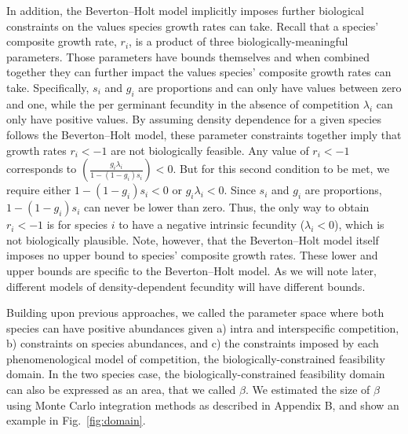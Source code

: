\begin{refsection}
In addition, the Beverton--Holt model implicitly imposes further biological constraints on the values species growth rates can take. Recall that a species' composite growth rate, $r_{i}$, is a product of three biologically-meaningful parameters. Those parameters have bounds themselves and when combined together they can further impact the values species' composite growth rates can take. Specifically, $s_{i}$ and $g_{i}$ are proportions and can only have values between zero and one, while the per germinant fecundity in the absence of competition $\lambda_{i}$ can only have positive values. By assuming density dependence for a given species follows the Beverton--Holt model, these parameter constraints together imply that growth rates $r_i < -1$ are not biologically feasible. Any value of $r_{i} < -1$ corresponds to $\left( \frac{g_{i}\lambda_{i}}{1-(1-g_{i})s_{i}} \right) < 0$. But for this second condition to be met, we require either $1-(1-g_{i})s_{i} < 0$ or $g_{i}\lambda_{i} < 0$. Since $s_{i}$ and $g_{i}$ are proportions, $1-(1-g_{i})s_{i}$ can never be lower than zero.  Thus, the only way to obtain $r_{i} < -1$ is for species $i$ to have a negative intrinsic fecundity ($\lambda_i < 0$), which is not biologically plausible. Note, however, that the Beverton--Holt model itself imposes no upper bound to species' composite growth rates. These lower and upper bounds are specific to the Beverton--Holt model. As we will note later, different models of density-dependent fecundity will have different bounds.


Building upon previous approaches, we called the parameter space where both species can have positive abundances given a) intra and interspecific competition, b) constraints on species abundances, and c) the constraints imposed by each phenomenological model of competition, the biologically-constrained feasibility domain. In the two species case,  the biologically-constrained feasibility domain can also be expressed as an area, that we called $\beta$. We estimated the size of $\beta$ using Monte Carlo integration methods as described in Appendix B, and show an example in Fig.~\ref{fig:domain}.


\end{refsection}
